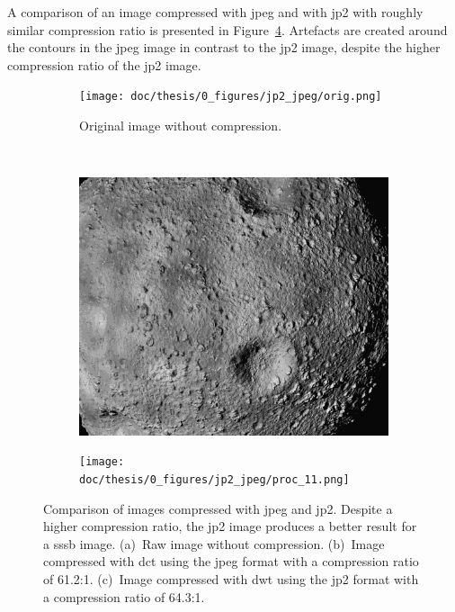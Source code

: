 A comparison of an image compressed with \gls{jpeg} and with \gls{jp2} with roughly similar compression ratio is presented in Figure~\ref{fig:jpg_jp2_comparison}. Artefacts are created around the contours in the \gls{jpeg} image in contrast to the \gls{jp2} image, despite the higher compression ratio of the \gls{jp2} image.
\begin{figure}[htb]
    \centering
    \begin{subfigure}[b]{0.6\textwidth}
        \texttt{[image: doc/thesis/0\_figures/jp2\_jpeg/orig.png]}
        \caption{Original image without compression.}
        \label{fig:jpg_jp2_oirg}
    \end{subfigure}
    \\
    \begin{subfigure}[b]{0.48\textwidth}
        \includegraphics[width=\textwidth]{doc/thesis/0_figures/jp2_jpeg/proc_5.jpg}
        \caption{}
        \label{fig:jpg_jp2_jpeg}
    \end{subfigure}
    \begin{subfigure}[b]{0.48\textwidth}
        \texttt{[image: doc/thesis/0\_figures/jp2\_jpeg/proc\_11.png]}
        \caption{}
        \label{fig:jpg_jp2_jp2}
    \end{subfigure}
    \caption{Comparison of images compressed with \gls{jpeg} and \gls{jp2}. Despite a higher compression ratio, the \gls{jp2} image produces a better result for a \gls{sssb} image. (a)~Raw image without compression. (b)~Image compressed with \gls{dct} using the \gls{jpeg} format with a compression ratio of 61.2:1. (c)~Image compressed with \gls{dwt} using the \gls{jp2} format with a compression ratio of 64.3:1.}
    \label{fig:jpg_jp2_comparison}
\end{figure}

